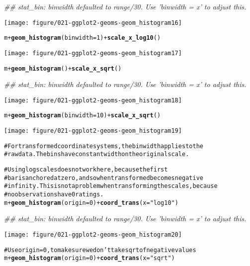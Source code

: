 \documentclass[a4paper,titlepage]{tufte-handout}\usepackage{graphicx, color}
\makeatletter
\def\maxwidth{ %
  \ifdim\Gin@nat@width>\linewidth
    \linewidth
  \else
    \Gin@nat@width
  \fi
}
\newcommand{\hlfunctioncall}[1]{\textcolor[rgb]{0.501960784313725,0,0.329411764705882}{\textbf{#1}}}%
\newcommand{\hlstring}[1]{\textcolor[rgb]{0.6,0.6,1}{#1}}%
\newcommand{\hlcomment}[1]{\textcolor[rgb]{0.180392156862745,0.6,0.341176470588235}{#1}}%
\newenvironment{kframe}{%
 \def\at@end@of@kframe{}%
 \ifinner\ifhmode%
  \def\at@end@of@kframe{\end{minipage}}%
  \begin{minipage}{\columnwidth}%
 \fi\fi%
 \def\FrameCommand##1{\hskip\@totalleftmargin \hskip-\fboxsep
 \colorbox{shadecolor}{##1}\hskip-\fboxsep
     \hskip-\linewidth \hskip-\@totalleftmargin \hskip\columnwidth}%
 \MakeFramed {\advance\hsize-\width
   \@totalleftmargin\z@ \linewidth\hsize
   \@setminipage}}%
 {\par\unskip\endMakeFramed%
 \at@end@of@kframe}
\newenvironment{knitrout}{}{} %
\makeatother
\begin{document}
\begin{knitrout}
\begin{kframe}
{\ttfamily\noindent\itshape\textcolor{messagecolor}{\#\# stat\_bin: binwidth defaulted to range/30. Use 'binwidth = x' to adjust this.}}\end{kframe}
\texttt{[image: figure/021-ggplot2-geoms-geom\_histogram16]} 
\begin{kframe}\begin{alltt}
m + \hlfunctioncall{geom_histogram}(binwidth = 1) + \hlfunctioncall{scale_x_log10}()
\end{alltt}
\end{kframe}
\texttt{[image: figure/021-ggplot2-geoms-geom\_histogram17]} 
\begin{kframe}\begin{alltt}
m + \hlfunctioncall{geom_histogram}() + \hlfunctioncall{scale_x_sqrt}()
\end{alltt}


{\ttfamily\noindent\itshape\textcolor{messagecolor}{\#\# stat\_bin: binwidth defaulted to range/30. Use 'binwidth = x' to adjust this.}}\end{kframe}
\texttt{[image: figure/021-ggplot2-geoms-geom\_histogram18]} 
\begin{kframe}\begin{alltt}
m + \hlfunctioncall{geom_histogram}(binwidth = 10) + \hlfunctioncall{scale_x_sqrt}()
\end{alltt}
\end{kframe}
\texttt{[image: figure/021-ggplot2-geoms-geom\_histogram19]} 
\begin{kframe}\begin{alltt}

\hlcomment{# For transformed coordinate systems, the binwidth applies to the}
\hlcomment{# raw data.  The bins have constant width on the original scale.}

\hlcomment{# Using log scales does not work here, because the first}
\hlcomment{# bar is anchored at zero, and so when transformed becomes negative}
\hlcomment{# infinity.  This is not a problem when transforming the scales, because}
\hlcomment{# no observations have 0 ratings.}
m + \hlfunctioncall{geom_histogram}(origin = 0) + \hlfunctioncall{coord_trans}(x = \hlstring{"log10"})
\end{alltt}


{\ttfamily\noindent\itshape\textcolor{messagecolor}{\#\# stat\_bin: binwidth defaulted to range/30. Use 'binwidth = x' to adjust this.}}\end{kframe}
\texttt{[image: figure/021-ggplot2-geoms-geom\_histogram20]} 
\begin{kframe}\begin{alltt}
\hlcomment{# Use origin = 0, to make sure we don't take sqrt of negative values}
m + \hlfunctioncall{geom_histogram}(origin = 0) + \hlfunctioncall{coord_trans}(x = \hlstring{"sqrt"})
\end{alltt}



\end{kframe}
\end{knitrout}
\end{document}
